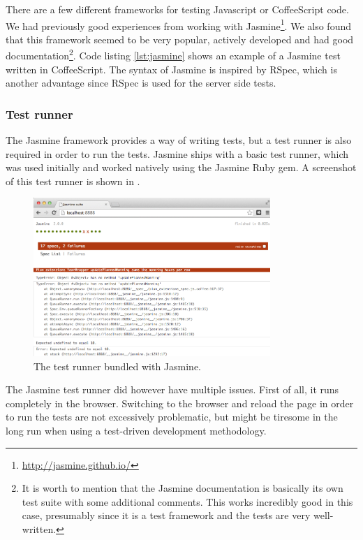 
There are a few different frameworks for testing Javascript or
CoffeeScript code. We had previously good experiences from working with
Jasmine\footnote{\url{http://jasmine.github.io/}}. We also found that
this framework seemed to be very popular, actively developed and had
good documentation\footnote{It is worth to mention that the Jasmine
documentation is basically its own test suite with some additional
comments. This works incredibly good in this case, presumably since it
is a test framework and the tests are very well-written.}. Code listing
\ref{lst:jasmine} shows an example of a Jasmine test written in
CoffeeScript. The syntax of Jasmine is inspired by RSpec, which is
another advantage since RSpec is used for the server side tests.\\

\subsubsection{Test runner}

The Jasmine framework provides a way of writing tests, but a test runner
is also required in order to run the tests. Jasmine ships with a basic
test runner, which was used initially and worked natively using
the Jasmine Ruby gem. A screenshot of this test runner is shown in
.\\

\begin{figure}
\centering
\includegraphics[width=0.8\textwidth]{results/choices/jasmine_runner}
\caption{The test runner bundled with Jasmine.}
\label{fig:jasmine_runner}
\end{figure}

The Jasmine test runner did however have multiple issues. First of all,
it runs completely in the browser. Switching to the browser and reload
the page in order to run the tests are not excessively problematic, but
might be tiresome in the long run when using a test-driven development
methodology.\\

